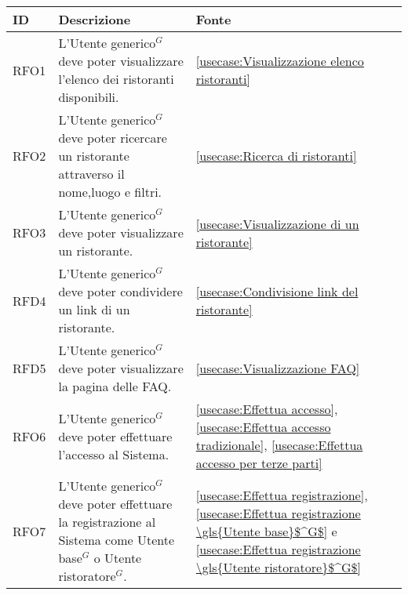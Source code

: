 \begin{table}[H]
	\renewcommand{\arraystretch}{1.5}
	\centering
	\begin{tabularx}{\textwidth}{l|X|p{2cm}}
		\textbf{ID} & \textbf{Descrizione}                                                                                       & \textbf{Fonte}                                                                                                                                               \\
		\hline
		RFO1        & L'\gls{Utente generico}$^G$ deve poter visualizzare l'elenco dei ristoranti disponibili.                             & \autoref{usecase:Visualizzazione elenco ristoranti}                                                                                                          \\
		\hline
		RFO2        & L'\gls{Utente generico}$^G$ deve poter ricercare un ristorante attraverso il nome,luogo e filtri.                    & \autoref{usecase:Ricerca di ristoranti}                                                                                                                      \\
		\hline
		RFO3        & L'\gls{Utente generico}$^G$ deve poter visualizzare un ristorante.                                                   & \autoref{usecase:Visualizzazione di un ristorante}                                                                                                           \\
		\hline
		RFD4        & L'\gls{Utente generico}$^G$ deve poter condividere un link di un ristorante.                                         & \autoref{usecase:Condivisione link del ristorante}                                                                                                           \\
		\hline
		RFD5        & L'\gls{Utente generico}$^G$ deve poter visualizzare la pagina delle FAQ.                                             & \autoref{usecase:Visualizzazione FAQ}                                                                                                                        \\
		\hline
		RFO6        & L'\gls{Utente generico}$^G$ deve poter effettuare l'accesso al Sistema.                                              & \autoref{usecase:Effettua accesso}, \autoref{usecase:Effettua accesso tradizionale}, \autoref{usecase:Effettua accesso per terze parti}                      \\
		\hline
		RFO7        & L'\gls{Utente generico}$^G$ deve poter effettuare la registrazione al Sistema come \gls{Utente base}$^G$ o \gls{Utente ristoratore}$^G$. & \autoref{usecase:Effettua registrazione}, \autoref{usecase:Effettua registrazione \gls{Utente base}$^G$} e \autoref{usecase:Effettua registrazione \gls{Utente ristoratore}$^G$} \\

\end{tabularx}
\end{table}
